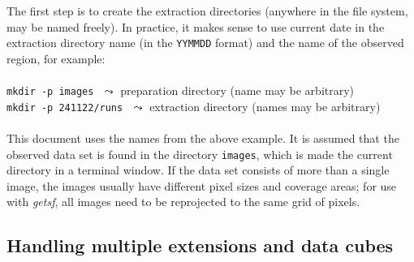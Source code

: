 \documentclass[a4paper,10pt]{article}
\begin{document}
The first step is to create the extraction directories (anywhere in the file system, may be named freely). In practice, it makes
sense to use current date in the extraction directory name (in the \verb!YYMMDD! format) and the name of the observed region, for 
example:\\
\vspace{-2mm}\noindent\\
{\small\verb!mkdir -p images!} $\,\,\leadsto$ preparation directory (name may be arbitrary)\\
{\small\verb!mkdir -p 241122/runs!\vspace{-2mm}} $\,\,\leadsto$ extraction directory (names may be arbitrary)\\\\
This document uses the names from the above example. It is assumed that the observed data set is found in the directory
\verb!images!, which is made the current directory in a terminal window. If the data set consists of more than a single image, the
images usually have different pixel sizes and coverage areas; for use with \textsl{getsf}, all images need to be reprojected to the
same grid of pixels.


\subsection{Handling multiple extensions and data cubes}
\label{hipecube}
\end{document}
